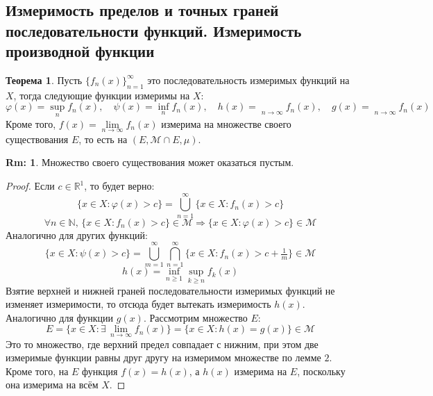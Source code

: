 \documentclass[12pt]{article}
\newcommand{\MR}{\mathbb{R}}
\newcommand{\MN}{\mathbb{N}}
\newcommand{\MM}{\mathcal{M}}
\theoremstyle{definition}
\newtheorem{rem}{Rm:}
\newtheorem{theorem}{Теорема}
\DeclareMathOperator*\lowlim{\underline{lim}}
\DeclareMathOperator*\uplim{\overline{lim}}
\begin{document}
\subsection*{Измеримость пределов и точных граней последовательности функций. Измеримость производной функции}
\begin{theorem}
	Пусть $\{f_n(x)\}_{n = 1}^{\infty}$ это последовательность измеримых функций на $X$, тогда следующие функции измеримы на $X$:
	$$
		\varphi(x) = \sup\limits_n f_n(x), \quad \psi(x) = \inf\limits_n f_n(x), \quad h(x) = \uplim\limits_{n \to \infty}f_n(x), \quad g(x) = \lowlim\limits_{n \to \infty}f_n(x)
	$$
	Кроме того, $f(x) = \lim\limits_{n \to \infty}f_n(x)$ измерима на множестве своего существования $E$, то есть на $(E, \MM \cap E, \mu)$.
\end{theorem}
\begin{rem}
	Множество своего существования может оказаться пустым.
\end{rem}
\begin{proof}
	Если $c \in \MR^1$, то будет верно:
	$$
		\{x \in X \colon \varphi(x) > c\} = \bigcup\limits_{n = 1}^{\infty}\{x \in X \colon f_n(x) > c\}
	$$
	$$	
		\forall n \in \MN, \, \{x \in X \colon f_n(x) > c\} \in \MM \Rightarrow  \{x \in X \colon \varphi(x) > c\} \in \MM
	$$
	Аналогично для других функций:
	$$
		\{x \in X \colon \psi(x) > c\} = \bigcup\limits_{m = 1}^{\infty}\bigcap\limits_{n = 1}^{\infty}\{x \in X \colon f_n(x) > c + \tfrac{1}{m}\} \in \MM
	$$
	$$
		h(x) = \inf\limits_{n \geq 1}\sup\limits_{k \geq n}f_k(x)
	$$
	Взятие верхней и нижней граней последовательности измеримых функций не изменяет измеримости, то отсюда будет вытекать измеримость $h(x)$. Аналогично для функции $g(x)$. Рассмотрим множество $E$:
	$$
		E = \{x \in X \colon \exists \, \lim\limits_{n \to \infty} f_n(x)\} = \{x\in X \colon h(x) = g(x)\} \in \MM
	$$
	Это то множество, где верхний предел совпадает с нижним, при этом две измеримые функции равны друг другу на измеримом множестве по лемме $2$. Кроме того, на $E$ функция $f(x) = h(x)$, а $h(x)$ измерима на $E$, поскольку она измерима на всём $X$.
\end{proof}
\end{document}
